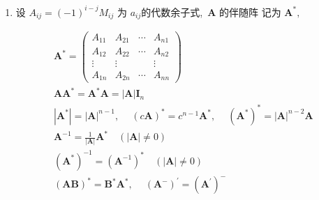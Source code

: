 \begin{enumerate}
		\item 设 $ A_{i j}=(-1)^{i-j} M_{i j}$  为  $a_{i j}  $的代数余子式,\   $\boldsymbol{A} $ 的伴随阵 记为  $\boldsymbol{A}^{*} ,\ $
		
		$$	\begin{array}{l}
			\boldsymbol{A}^{*}=\left(\begin{array}{cccc}
				A_{11} & A_{21} & \cdots & A_{n 1} \\
				A_{12} & A_{22} & \cdots & A_{n 2} \\
				\vdots & \vdots & & \vdots \\
				A_{1 n} & A_{2 n} & \cdots & A_{n n}
			\end{array}\right) \\
			\boldsymbol{A} \boldsymbol{A}^{*}=\boldsymbol{A}^{*} \boldsymbol{A}=|\boldsymbol{A}| \boldsymbol{I}_{n} \\
			\left|\boldsymbol{A}^{*}\right|=|\boldsymbol{A}|^{n-1},\  \quad(c \boldsymbol{A})^{*}=c^{n-1} \boldsymbol{A}^{*},\  \quad\left(\boldsymbol{A}^{*}\right)^{*}=|\boldsymbol{A}|^{n-2} \boldsymbol{A} \\
			\boldsymbol{A}^{-1}=\frac{1}{|\boldsymbol{A}|} \boldsymbol{A}^{*} \quad(|\boldsymbol{A}| \neq 0) \\
			\left(\boldsymbol{A}^{*}\right)^{-1}=\left(\boldsymbol{A}^{-1}\right)^{*} \quad(|\boldsymbol{A}| \neq 0) \\
			(\boldsymbol{A B})^{*}=\boldsymbol{B}^{*} \boldsymbol{A}^{*},\  \quad\left(\boldsymbol{A}^{-}\right)^{\prime}=\left(\boldsymbol{A}^{\prime}\right)^{-} \\
		\end{array}$$
		

\end{enumerate}
